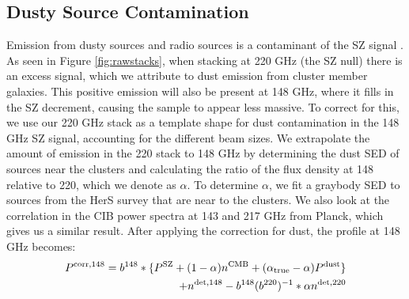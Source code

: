 \documentclass[a4paper,fleqn,usenatbib]{mnras}
\begin{document}
\subsection{Dusty Source Contamination}

Emission from dusty sources and radio sources is a contaminant of the SZ signal \citep{2005A&A...439..901A}. As seen in Figure \ref{fig:rawstacks}, when stacking at 220 GHz (the SZ null) there is an excess signal, which we attribute to dust emission from cluster member galaxies. This positive emission will also be present at 148 GHz, where it fills in the SZ decrement, causing the sample to appear less massive. To correct for this, we use our 220 GHz stack as a template shape for dust contamination in the 148 GHz SZ signal, accounting for the different beam sizes. We extrapolate the amount of emission in the 220 stack to 148 GHz by determining the dust SED of sources near the clusters and calculating the ratio of the flux density at 148 relative to 220, which we denote as $\alpha$. To determine $\alpha$, we fit a graybody SED to sources from the HerS survey that are near to the clusters. We also look at the correlation in the CIB power spectra at 143 and 217 GHz from Planck, which gives us a similar result. 
After applying the correction for dust, the profile at 148 GHz becomes:
\begin{equation}
\begin{split}
  P^{\rm corr,148} = b^{148} \ast \{ P^{\rm SZ} 
+ (1 - \alpha) n^{\rm CMB} + (\alpha_{\rm true} - \alpha) P^{\rm dust} \} 
\\+ n^{\rm det,148} - b^{148}( b^{220})^{-1} \ast \alpha n^{\rm det,220} 
  \end{split}
\end{equation}
\end{document}
